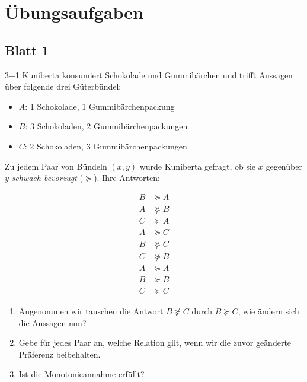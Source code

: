\chapter{Übungsaufgaben}


\section{Blatt 1}


\begin{question}[subtitle={Transitivität, Vollständigkeit und Monotonie}]{3+1}
	Kuniberta konsumiert Schokolade und Gummibärchen und trifft Aussagen über folgende drei Güterbündel:
	\begin{itemize}
		\item $A$: 1 Schokolade, 1 Gummibärchenpackung
		\item $B$: 3 Schokoladen, 2 Gummibärchenpackungen
		\item $C$: 2 Schokoladen, 3 Gummibärchenpackungen
	\end{itemize}

	Zu jedem Paar von Bündeln $(x, y)$ wurde Kuniberta gefragt, ob sie $x$ gegenüber $y$ \textit{schwach bevorzugt} ($\succeq$). Ihre Antworten:

	\begin{align*}
		B & \succeq A  \\
		A & \nsucceq B \\
		C & \succeq A  \\
		A & \succeq C  \\
		B & \nsucceq C \\
		C & \nsucceq B \\
		A & \succeq A  \\
		B & \succeq B  \\
		C & \succeq C
	\end{align*}
	\begin{enumerate}

		\item Angenommen wir tauschen die Antwort $B \nsucceq C$ durch $B \succeq C$, wie ändern sich die Aussagen nun?
		\item Gebe für jedes Paar an, welche Relation gilt, wenn wir die zuvor geänderte Präferenz beibehalten.
		\item Ist die Monotonieannahme erfüllt?
	\end{enumerate}
\end{question}
